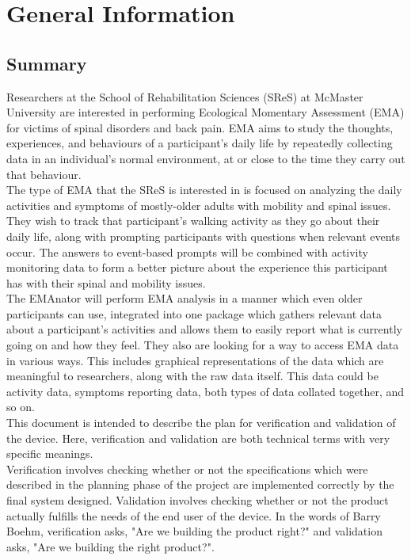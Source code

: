 \documentclass[12pt, titlepage]{article}
\begin{document}
\newpage


\section{General Information}

\subsection{Summary}

Researchers at the School of Rehabilitation Sciences (SReS) at McMaster University are interested in performing Ecological Momentary Assessment (EMA) for victims of spinal disorders and back pain. EMA aims to study the thoughts, experiences, and behaviours of a participant's daily life by repeatedly collecting data in an individual's normal environment, at or close to the time they carry out that behaviour.\\

The type of EMA that the SReS is interested in is focused on analyzing the daily activities and symptoms of mostly-older adults with mobility and spinal issues. They wish to track that participant's walking activity as they go about their daily life, along with prompting participants with questions when relevant events occur. The answers to event-based prompts will be combined with activity monitoring data to form a better picture about the experience this participant has with their spinal and mobility issues.\\

The EMAnator will perform EMA analysis in a manner which even older participants can use, integrated into one package which gathers relevant data about a participant's activities and allows them to easily report what is currently going on and how they feel. They also are looking for a way to access EMA data in various ways. This includes graphical representations of the data which are meaningful to researchers, along with the raw data itself. This data could be activity data, symptoms reporting data, both types of data collated together, and so on. \\

This document is intended to describe the plan for verification and validation of the device. Here, verification and validation are both technical terms with very specific meanings.\\

Verification involves checking whether or not the specifications which were described in the planning phase of the project are implemented correctly by the final system designed. Validation involves checking whether or not the product actually fulfills the needs of the end user of the device. In the words of Barry Boehm, verification asks, "Are we building the product right?" and validation asks, "Are we building the right product?"\cite{pham_1999}.
\end{document}
